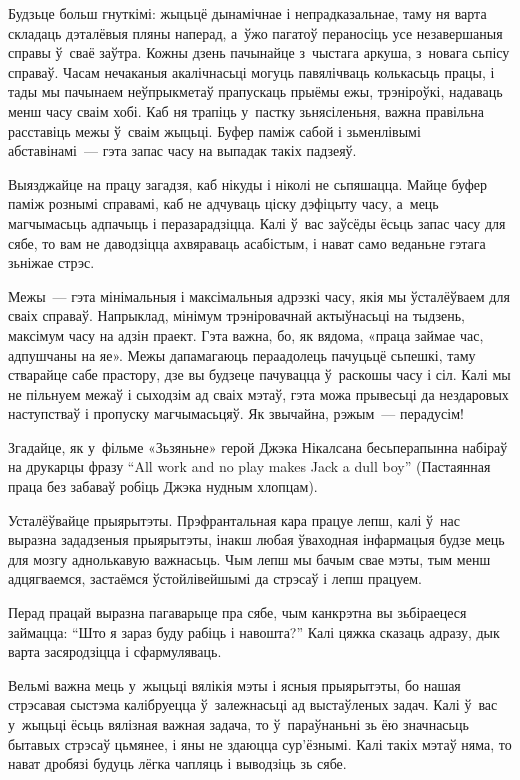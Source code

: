 Будзьце больш гнуткімі: жыцьцё дынамічнае і непрадказальнае, таму ня варта складаць дэталёвыя пляны наперад, а~ўжо пагатоў пераносіць усе незавершаныя справы ў~сваё заўтра. Кожны дзень пачынайце з~чыстага аркуша, з~новага сьпісу справаў. Часам нечаканыя акалічнасьці могуць павялічваць колькасьць працы, і тады мы пачынаем неўпрыкметаў прапускаць прыёмы ежы, трэніроўкі, надаваць менш часу сваім хобі. Каб ня трапіць у~пастку зьнясіленьня, важна правільна расставіць межы ў~сваім жыцьці. Буфер паміж сабой і зьменлівымі абставінамі~--- гэта запас часу на выпадак такіх падзеяў. 

Выязджайце на працу загадзя, каб нікуды і ніколі не сьпяшацца. Майце буфер паміж рознымі справамі, каб не адчуваць ціску дэфіцыту часу, а~мець магчымасьць адпачыць і перазарадзіцца. Калі ў~вас заўсёды ёсьць запас часу для сябе, то вам не даводзіцца ахвяраваць асабістым, і нават само веданьне гэтага зьніжае стрэс.

Межы~--- гэта мінімальныя і максімальныя адрэзкі часу, якія мы ўсталёўваем для сваіх справаў. Напрыклад, мінімум трэніровачнай актыўнасьці на тыдзень, максімум часу на адзін праект. Гэта важна, бо, як вядома, «праца займае час, адпушчаны на яе». Межы дапамагаюць пераадолець пачуцьцё сьпешкі, таму стварайце сабе прастору, дзе вы будзеце пачувацца ў~раскошы часу і сіл. Калі мы не пільнуем межаў і сыходзім ад сваіх мэтаў, гэта можа прывесьці да нездаровых наступстваў і пропуску магчымасьцяў. Як звычайна, рэжым~--- перадусім!

Згадайце, як у~фільме «Зьзяньне» герой Джэка Нікалсана бесьперапынна набіраў на друкарцы фразу ``All work and no play makes Jack a dull boy'' (Пастаянная праца без забаваў робіць Джэка нудным хлопцам).

Усталёўвайце прыярытэты. Прэфрантальная кара працуе лепш, калі ў~нас выразна зададзеныя прыярытэты, інакш любая ўваходная інфармацыя будзе мець для мозгу аднолькавую важнасьць. Чым лепш мы бачым свае мэты, тым менш адцягваемся, застаёмся ўстойлівейшымі да стрэсаў і лепш працуем.

Перад працай выразна пагаварыце пра сябе, чым канкрэтна вы зьбіраецеся займацца: ``Што я зараз буду рабіць і навошта?'' Калі цяжка сказаць адразу, дык варта засяродзіцца і сфармуляваць.

Вельмі важна мець у~жыцьці вялікія мэты і ясныя прыярытэты, бо нашая стрэсавая сыстэма калібруецца ў~залежнасьці ад выстаўленых задач. Калі ў~вас у~жыцьці ёсьць вялізная важная задача, то ў~параўнаньні зь ёю значнасьць бытавых стрэсаў цьмянее, і яны не здаюцца сур'ёзнымі. Калі такіх мэтаў няма, то нават дробязі будуць лёгка чапляць і выводзіць зь сябе.

